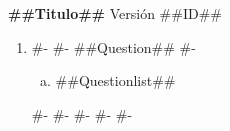 \documentclass{article}
\begin{document}

\textbf{##Titulo##} \textperiodcentered{} Versión ##ID##

\begin{enumerate}
#-
  \item
#-
#-
  ##Question##
#-
  \begin{enumerate}[(a)]
    \item ##Questionlist##
  \end{enumerate}
#-
#-
#-
#-
#-
\end{enumerate}
\end{document}
